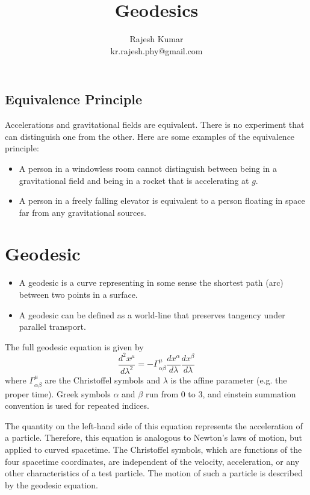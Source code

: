 \documentclass[a4paper, 12pt]{article}
\title{Geodesics}
\author{Rajesh Kumar\\kr.rajesh.phy@gmail.com}
\date{}
\begin{document}
\maketitle
\subsection*{Equivalence Principle}
Accelerations and gravitational fields are equivalent. There is no experiment that can distinguish one from the other.
Here are some examples of the equivalence principle:
\begin{itemize}
    \item A person in a windowless room cannot distinguish between being in a gravitational field and being in a rocket that is accelerating at \(g\).
    \item A person in a freely falling elevator is equivalent to a person floating in space far from any gravitational sources.
\end{itemize}
\section*{Geodesic}
\begin{itemize}
    \item A geodesic is a curve representing in some sense the shortest path (arc) between two points in a surface.
    \item A geodesic can be defined as a world-line that preserves tangency under parallel transport.
\end{itemize}
The full geodesic equation is given by
\begin{equation}
    \frac{d^2x^\mu}{d\lambda^2}  = -\Gamma^\mu_{\alpha\beta}\frac{dx^\alpha}{d\lambda}\frac{dx^\beta}{d\lambda}
\end{equation}
where $\Gamma^\mu_{\alpha\beta}$ are the Christoffel symbols and $\lambda$ is the affine parameter (e.g. the proper time). Greek symbols \(\alpha\) and \(\beta\) run from 0 to 3, and einstein summation convention is used for repeated indices.

The quantity on the left-hand side of this equation represents the acceleration of a particle. Therefore, this equation is analogous to Newton's laws of motion, but applied to curved spacetime. The Christoffel symbols, which are functions of the four spacetime coordinates, are independent of the velocity, acceleration, or any other characteristics of a test particle. The motion of such a particle is described by the geodesic equation.
\end{document}
